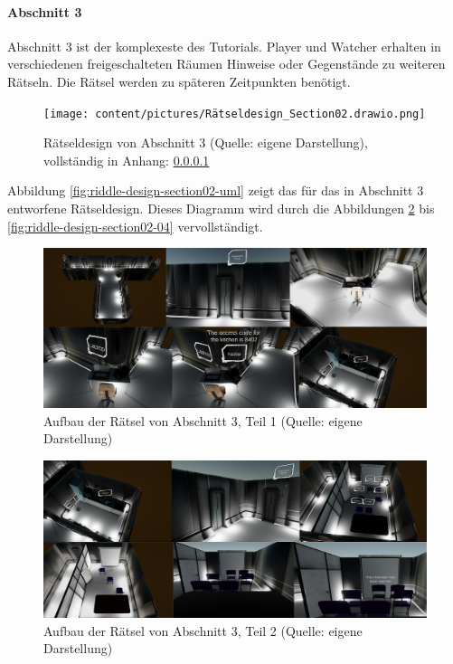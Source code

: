 \paragraph{Abschnitt 3}
Abschnitt 3 ist der komplexeste des Tutorials. Player und Watcher erhalten in verschiedenen freigeschalteten Räumen Hinweise oder Gegenstände zu weiteren Rätseln. Die Rätsel werden zu späteren Zeitpunkten benötigt.

\begin{figure}[ht]
\centering
\texttt{[image: content/pictures/Rätseldesign\_Section02.drawio.png]}
\caption{Rätseldesign von Abschnitt 3 (Quelle: eigene Darstellung), vollständig in Anhang: \ref{}}
\label{fig:r
iddle-design-section02-uml}
\end{figure}

Abbildung \ref{fig:riddle-design-section02-uml} zeigt das für das in Abschnitt 3 entworfene Rätseldesign. Dieses Diagramm wird durch die Abbildungen \ref{fig:riddle-design-section02-00} bis \ref{fig:riddle-design-section02-04} vervollständigt.

\begin{figure}[ht]
\centering
\includegraphics[width=1\linewidth]{content/pictures/Rätseldesign - Abschnitt02 - Rätsel00.png}
\caption{Aufbau der Rätsel von Abschnitt 3, Teil 1 (Quelle: eigene Darstellung)}
\label{fig:riddle-design-section02-00}
\end{figure}

\begin{figure}[ht]
\centering
\includegraphics[width=1\linewidth]{content/pictures/Rätseldesign - Abschnitt02 - Rätsel01.png}
\caption{Aufbau der Rätsel von Abschnitt 3, Teil 2 (Quelle: eigene Darstellung)}
\label{fig:riddle-design-section02-0l}
\end{figure}

